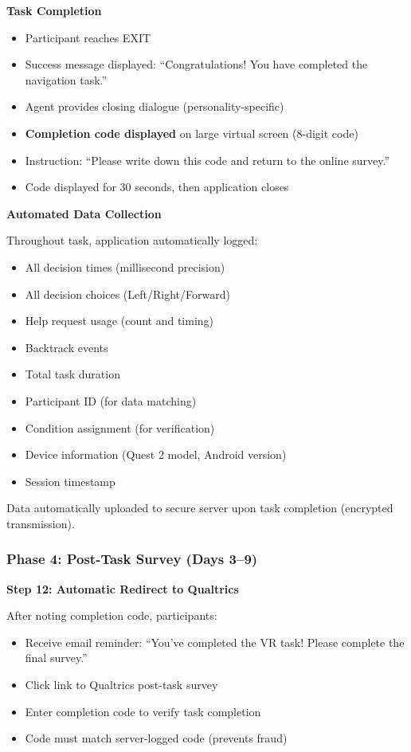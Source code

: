 \documentclass[12pt]{article}
\begin{document}
\textbf{Task Completion}
\begin{itemize}
    \item Participant reaches EXIT
    \item Success message displayed: ``Congratulations! You have completed the navigation task.''
    \item Agent provides closing dialogue (personality-specific)
    \item \textbf{Completion code displayed} on large virtual screen (8-digit code)
    \item Instruction: ``Please write down this code and return to the online survey.''
    \item Code displayed for 30 seconds, then application closes
\end{itemize}

\textbf{Automated Data Collection}

Throughout task, application automatically logged:
\begin{itemize}
    \item All decision times (millisecond precision)
    \item All decision choices (Left/Right/Forward)
    \item Help request usage (count and timing)
    \item Backtrack events
    \item Total task duration
    \item Participant ID (for data matching)
    \item Condition assignment (for verification)
    \item Device information (Quest 2 model, Android version)
    \item Session timestamp
\end{itemize}

Data automatically uploaded to secure server upon task completion (encrypted transmission).

\subsubsection{Phase 4: Post-Task Survey (Days 3--9)}

\textbf{Step 12: Automatic Redirect to Qualtrics}

After noting completion code, participants:
\begin{itemize}
    \item Receive email reminder: ``You've completed the VR task! Please complete the final survey.''
    \item Click link to Qualtrics post-task survey
    \item Enter completion code to verify task completion
    \item Code must match server-logged code (prevents fraud)
\end{itemize}
\end{document}
